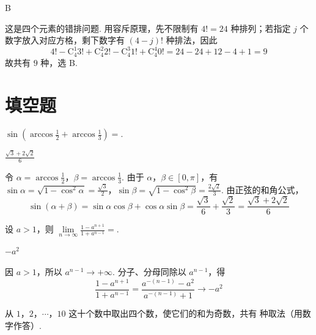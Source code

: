 \documentclass[UTF8,a4paper,oneside,11pt]{ctexbook}
\begin{document}
\begin{answer}
B
\end{answer}

\begin{solution}
这是四个元素的错排问题. 用容斥原理，先不限制有 \(4!=24\) 种排列；若指定 \(j\) 个数字放入对应方格，剩下数字有 \((4-j)!\) 种排法，因此
\[
4!-\mathrm C_4^1 3!+\mathrm C_4^2 2!-\mathrm C_4^3 1!+\mathrm C_4^4 0!
=24-24+12-4+1=9
\]
故共有 \(9\) 种，选 B.
\end{solution}

\section{填空题}

\begin{problem}
\(\sin\left(\arccos \frac{1}{2}+\arccos \frac{1}{3}\right)=\)\fillinblank{}.
\end{problem}

\begin{answer}
\(\frac{\sqrt{3}+2\sqrt{2}}{6}\)
\end{answer}

\begin{solution}
令 \(\alpha=\arccos\frac12\)，\(\beta=\arccos\frac13\). 由于 \(\alpha\)，\(\beta\in[0,\pi]\)，有
\(\sin\alpha=\sqrt{1-\cos^2\alpha}=\frac{\sqrt3}{2}\)，\(\sin\beta=\sqrt{1-\cos^2\beta}=\frac{2\sqrt2}{3}\).
由正弦的和角公式，
\[
\sin(\alpha+\beta)=\sin\alpha\cos\beta+\cos\alpha\sin\beta
=\frac{\sqrt3}{6}+\frac{\sqrt2}{3}
=\frac{\sqrt3+2\sqrt2}{6}
\]
\end{solution}

\begin{problem}
设 \(a>1\)，则 \(\displaystyle\lim\limits_{n\to\infty}\frac{1-a^{n+1}}{1+a^{n-1}}=\)\fillinblank{}.
\end{problem}

\begin{answer}
\(-a^2\)
\end{answer}

\begin{solution}
因 \(a>1\)，所以 \(a^{n-1}\to+\infty\). 分子、分母同除以 \(a^{n-1}\)，得
\[
\frac{1-a^{n+1}}{1+a^{n-1}}
=\frac{a^{-(n-1)}-a^2}{a^{-(n-1)}+1}
\longrightarrow -a^2
\]
\end{solution}

\begin{problem}
从 \(1\)，\(2\)，\(\cdots\)，\(10\) 这十个数中取出四个数，使它们的和为奇数，共有\fillinblank{} 种取法（用数字作答）.
\end{problem}
\end{document}
